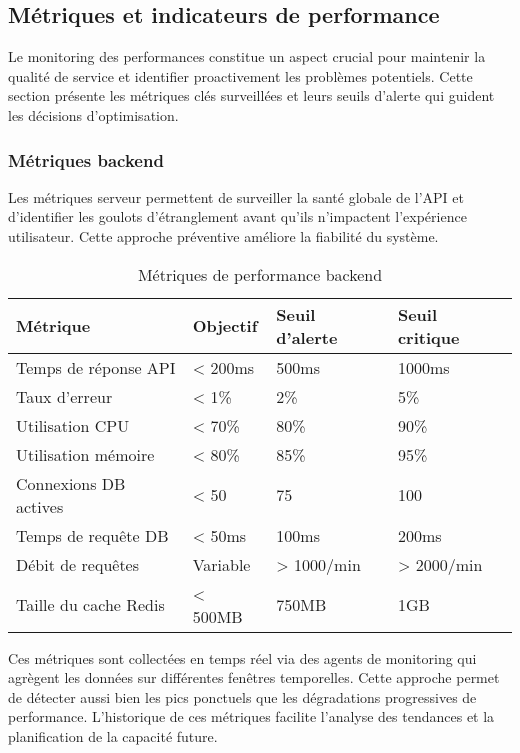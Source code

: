 \subsection{Métriques et indicateurs de performance}

Le monitoring des performances constitue un aspect crucial pour maintenir la qualité de service et identifier proactivement les problèmes potentiels. Cette section présente les métriques clés surveillées et leurs seuils d'alerte qui guident les décisions d'optimisation.

\subsubsection{Métriques backend}

Les métriques serveur permettent de surveiller la santé globale de l'API et d'identifier les goulots d'étranglement avant qu'ils n'impactent l'expérience utilisateur. Cette approche préventive améliore la fiabilité du système.

\begin{table}[h]
\centering
\begin{tabular}{|l|l|l|l|}
\hline
\textbf{Métrique} & \textbf{Objectif} & \textbf{Seuil d'alerte} & \textbf{Seuil critique} \\
\hline
Temps de réponse API & < 200ms & 500ms & 1000ms \\
\hline
Taux d'erreur & < 1\% & 2\% & 5\% \\
\hline
Utilisation CPU & < 70\% & 80\% & 90\% \\
\hline
Utilisation mémoire & < 80\% & 85\% & 95\% \\
\hline
Connexions DB actives & < 50 & 75 & 100 \\
\hline
Temps de requête DB & < 50ms & 100ms & 200ms \\
\hline
Débit de requêtes & Variable & > 1000/min & > 2000/min \\
\hline
Taille du cache Redis & < 500MB & 750MB & 1GB \\
\hline
\end{tabular}
\caption{Métriques de performance backend}
\end{table}

Ces métriques sont collectées en temps réel via des agents de monitoring qui agrègent les données sur différentes fenêtres temporelles. Cette approche permet de détecter aussi bien les pics ponctuels que les dégradations progressives de performance. L'historique de ces métriques facilite l'analyse des tendances et la planification de la capacité future.

